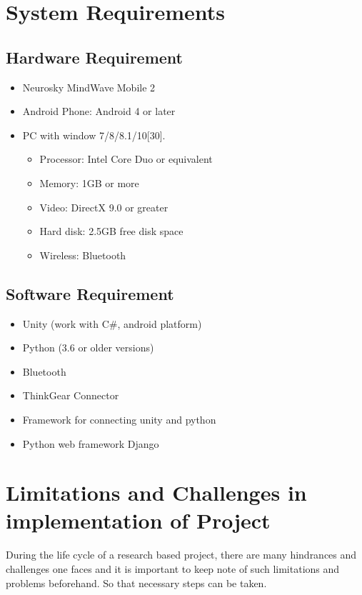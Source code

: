 \documentclass[a4paper, 12pt, oneside]{uet_thesis}
\begin{document}
\newpage
\chapter{System Requirements}

\section{Hardware Requirement}

\begin{itemize}
\item Neurosky MindWave Mobile 2
\item Android Phone: Android 4 or later
\item PC with window 7/8/8.1/10[30].
\begin{itemize}
     \item Processor: Intel Core Duo or equivalent
     \item Memory: 1GB or more
     \item Video: DirectX 9.0 or greater
     \item Hard disk: 2.5GB free disk space
     \item Wireless: Bluetooth
\end{itemize}
\end{itemize}

\section{Software Requirement}
\begin{itemize}
\item Unity (work with C\#, android platform)
\item Python (3.6 or older versions)
\item Bluetooth
\item ThinkGear Connector
\item Framework for connecting unity and python
\item Python web framework Django
\end{itemize}


\newpage
\chapter{Limitations and Challenges in implementation of Project}

During the life cycle of a research based project, there are many hindrances and challenges one faces and it is important to keep note of such limitations and problems beforehand. So that necessary steps can be taken.
\end{document}
